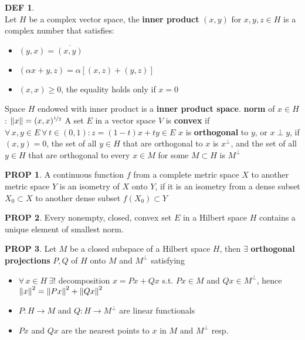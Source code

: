 \documentclass[hidelinks,10pt]{article}
\theoremstyle{definition}
\newtheorem*{defin}{DEF}
\theoremstyle{dotles}
\theoremstyle{dotless}
\newtheorem{proposition}{PROP}[section]
\theoremstyle{remark}
\begin{document}
\begin{defin}~\\
Let $H$ be a complex vector space, the \textbf{inner product} $(x,y)$ for $x,y,z\in H$ is a complex number that satisfies:\begin{itemize}
    \item $(y,x)=\overline{(x,y)}$
    \item $(\alpha x+y,z)=\alpha[(x,z)+(y,z)]$
    \item $(x,x)\geq0$, the equality holds only if $x=0$
\end{itemize}
Space $H$ endowed with inner product is a \textbf{inner product space}.\bigbreak
\textbf{norm} of $x\in H$: $\norm{x}=(x,x)^{\nicefrac{1}{2}}$\bigbreak
A set $E$ in a vector space $V$ is \textbf{convex} if $\forall\,x,y\in E\ \forall\,t\in(0,1):z=(1-t)x+ty\in E$\newline
$x$ is \textbf{orthogonal} to $y$, or $x\perp y$, if $(x,y)=0$, the set of all $y\in H$ that are orthogonal to $x$ is $x^\perp$, and the set of all $y\in H$ that are orthogonal to every $x\in M$ for some $M\subset H$ is $M^\perp$
\end{defin}

\begin{proposition}
A continuous function $f$ from a complete metric space $X$ to another metric space $Y$ is an isometry of $X$ onto $Y$, if it is an isometry from a dense subset $X_0\subset X$ to another dense subset $f(X_0)\subset Y$
\end{proposition}

\begin{proposition}
Every nonempty, closed, convex set $E$ in a Hilbert space $H$ contains a unique element of smallest norm. 
\end{proposition}

\begin{proposition}
Let $M$ be a closed subspace of a Hilbert space $H$, then $\exists$ \textbf{orthogonal projections} $P,Q$ of $H$ onto $M$ and $M^\perp$ satisfying\begin{itemize}
    \item $\forall\,x\in H\ \exists!$ decomposition $x=Px+Qx$ s.t. $Px\in M$ and $Qx\in M^\perp$, hence $\norm{x}^2=\norm{Px}^2+\norm{Qx}^2$
    \item $P:H\to M$ and $Q:H\to M^\perp$ are linear functionals
    \item $Px$ and $Qx$ are the nearest points to $x$ in $M$ and $M^\perp$ resp.
\end{itemize}
\end{proposition}
\end{document}
